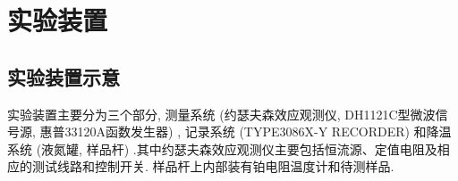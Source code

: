 \documentclass[font=default]{mpltx}
\newcommand{\note}[1]{{\color{gray}#1}}
\newcommand*\cs[1]{\texttt{\textbackslash #1}}
\newcommand*\code[1]{\texttt{#1}}
\newcommand*\file[1]{\textbf{\texttt{#1}}}
\begin{document}




\section{实验装置}
\subsection{实验装置示意}

实验装置主要分为三个部分, 测量系统 (约瑟夫森效应观测仪, DH1121C型微波信号源, 惠普33120A函数发生器) , 记录系统 (TYPE3086X-Y RECORDER) 和降温系统 (液氮罐, 样品杆) .其中约瑟夫森效应观测仪主要包括恒流源、定值电阻及相应的测试线路和控制开关. 样品杆上内部装有铂电阻温度计和待测样品. 
\end{document}
